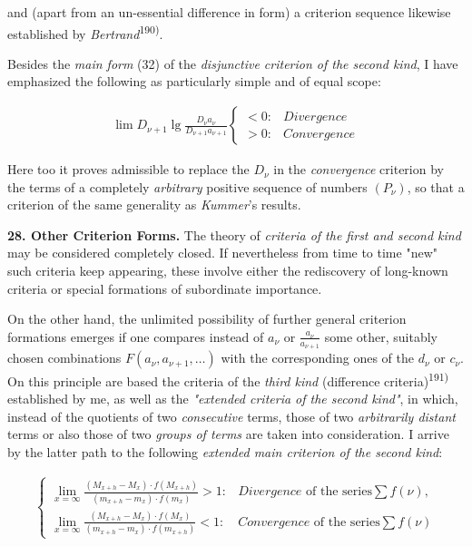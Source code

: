 \thispagestyle{fancy}

\vspace{0.5cm}

and (apart from an un-essential difference in form) a criterion sequence likewise established by \textit{Bertrand}\textsuperscript{190)}.

Besides the \textit{main form} (32) of the \textit{disjunctive criterion of the second kind}, I have emphasized the following as particularly simple and of equal scope:

\vspace{-0.3cm}
\begin{align}
    \lim D_{\nu+1} \lg \frac{D_\nu a_\nu}{D_{\nu+1} a_{\nu+1}} \begin{cases} < 0: & \textit{Divergence} \\ > 0: & \textit{Convergence} \end{cases}
\end{align}

Here too it proves admissible to replace the $D_\nu$ in the \textit{convergence} criterion by the terms of a completely \textit{arbitrary} positive sequence of numbers $(P_\nu)$, so that a criterion of the same generality as \textit{Kummer}'s results.

\vspace{0.3cm}
\textbf{28. Other Criterion Forms.} The theory of \textit{criteria of the first and second kind} may be considered completely closed. If nevertheless from time to time "new" such criteria keep appearing, these involve either the rediscovery of long-known criteria or special formations of subordinate importance.

On the other hand, the unlimited possibility of further general criterion formations emerges if one compares instead of $a_\nu$ or $\frac{a_\nu}{a_{\nu+1}}$ some other, suitably chosen combinations $F(a_\nu, a_{\nu+1}, \ldots)$ with the corresponding ones of the $d_\nu$ or $c_\nu$. On this principle are based the criteria of the \textit{third kind} (difference criteria)\textsuperscript{191)} established by me, as well as the \textit{"extended criteria of the second kind"}, in which, instead of the quotients of two \textit{consecutive} terms, those of two \textit{arbitrarily distant} terms or also those of two \textit{groups of terms} are taken into consideration. I arrive by the latter path to the following \textit{extended main criterion of the second kind}:

\vspace{-0.3cm}
\begin{align}
\begin{cases} \lim_{x=\infty} \frac{(M_{x+h} - M_x) \cdot f(M_{x+h})}{(m_{x+h} - m_x) \cdot f(m_x)} > 1: & \textit{Divergence } \text{of the series} \sum f(\nu), \\ \lim_{x=\infty} \frac{(M_{x+h} - M_x) \cdot f(M_x)}{(m_{x+h} - m_x) \cdot f(m_{x+h})} < 1: & \textit{Convergence } \text{of the series} \sum f(\nu) \end{cases}
\end{align}

